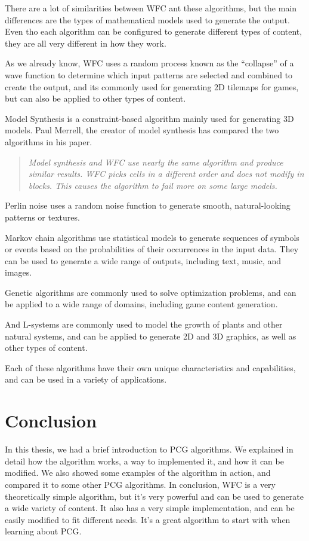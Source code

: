 \documentclass[10pt,oneside,a4paper]{article}
\begin{document}
There are a lot of similarities between WFC ant these algorithms, but the main differences are the types of mathematical models used to generate the output.
Even tho each algorithm can be configured to generate different types of content, they are all very different in how they work.

As we already know, WFC uses a random process known as the ``collapse'' of a wave function to determine which input patterns are selected and combined to create the output, and its commonly used for generating 2D tilemaps for games, but can also be applied to other types of content.

Model Synthesis is a constraint-based algorithm mainly used for generating 3D models.
Paul Merrell, the creator of model synthesis has compared the two algorithms in his paper\cite{Mer21}.
\begin{quote}
    \textit{Model synthesis and WFC use nearly the same algorithm and produce similar results. WFC picks cells in a different
order and does not modify in blocks. This causes the algorithm to fail more on some large models.}
\end{quote}

Perlin noise uses a random noise function to generate smooth, natural-looking patterns or textures\cite{PerNoise}.

Markov chain algorithms use statistical models to generate sequences of symbols or events based on the probabilities of their occurrences in the input data.
They can be used to generate a wide range of outputs, including text, music, and images\cite{MCHAIN}.

Genetic algorithms are commonly used to solve optimization problems, and can be applied to a wide range of domains, including game content generation\cite{GeneticAA}.

And L-systems are commonly used to model the growth of plants and other natural systems, and can be applied to generate 2D and 3D graphics, as well as other types of content\cite{LSys}.

Each of these algorithms have their own unique characteristics and capabilities, and can be used in a variety of applications.

\section{Conclusion}\label{sec:conclusion}
In this thesis, we had a brief introduction to PCG algorithms.
We explained in detail how the algorithm works, a way to implemented it, and how it can be modified.
We also showed some examples of the algorithm in action, and compared it to some other PCG algorithms.
In conclusion, WFC is a very theoretically simple algorithm, but it's very powerful and can be used to generate a wide variety of content.
It also has a very simple implementation, and can be easily modified to fit different needs.
It's a great algorithm to start with when learning about PCG\@.



\end{document}
